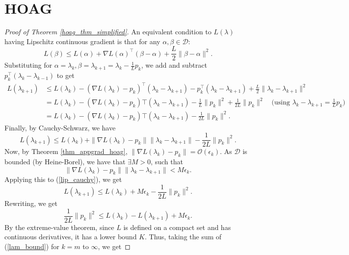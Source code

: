 \documentclass[11pt, twoside]{report}
\begin{document}
\section{HOAG}
\begin{proof}[Proof of Theorem \ref{hoag_thm_simplified}]
An equivalent condition to $L(\lambda)$ having Lipschitz continuous gradient is that for any $\alpha,\beta \in \mathcal{D}:$
\begin{equation} \label{lipschitz_equiv}
    L(\beta) \leq L(\alpha) + \nabla L(\alpha)^\top (\beta - \alpha) + \frac{L}{2}\|\beta - \alpha\|^2.
\end{equation}
Substituting for $\alpha = \lambda_k, \beta = \lambda_{k+1} = \lambda_k - \frac{1}{L}p_k$, we add and subtract $p_k^\top(\lambda_k - \lambda_{k-1})$ to get
\begin{align}
    L(\lambda_{k+1}) &\leq L(\lambda_k) - (\nabla L(\lambda_k) -p_k)^\top(\lambda_k - \lambda_{k+1}) -p_k^\top(\lambda_k - \lambda_{k+1})+\frac{L}{2}\|\lambda_k - \lambda_{k+1}\|^2 \\
    &= L(\lambda_k) - (\nabla L(\lambda_k) -p_k)\top(\lambda_k - \lambda_{k+1}) -\frac{1}{L}\|p_k\|^2+\frac{1}{2L}\|p_k\|^2 \quad \text{(using } \lambda_{k}-\lambda_{k+1} = \frac{1}{L}p_k) \\
    &=L(\lambda_k) - (\nabla L(\lambda_k) -p_k)\top(\lambda_k - \lambda_{k+1}) -\frac{1}{2L}\|p_k\|^2.
\end{align}
Finally, by Cauchy-Schwarz, we have
\begin{equation} \label{lip_cauchy}
    L(\lambda_{k+1}) \leq L(\lambda_k) + \|\nabla L(\lambda_k) -p_k\|\|\lambda_k - \lambda_{k+1}\| -\frac{1}{2L}\|p_k\|^2.
\end{equation}
Now, by Theorem \ref{thm_appgrad_hoag}, $\|\nabla L(\lambda_k) -p_k\| = \mathcal{O}(\epsilon_k)$. As $\mathcal{D}$ is bounded (by Heine-Borel), we have that $\exists M>0$, such that
\[\|\nabla L(\lambda_k) -p_k\|\|\lambda_k - \lambda_{k+1}\| < M\epsilon_k.\]
Applying this to (\ref{lip_cauchy}), we get
\begin{equation} \label{lip_cauchy_2}
    L(\lambda_{k+1}) \leq L(\lambda_k) + M\epsilon_k -\frac{1}{2L}\|p_k\|^2.
\end{equation}
Rewriting, we get
\begin{equation} \label{lam_bound}
    \frac{1}{2L}\|p_k\|^2 \leq L(\lambda_k) - L(\lambda_{k+1}) + M\epsilon_k.
\end{equation}
By the extreme-value theorem, since $L$ is defined on a compact set and has continuous derivatives, it has a lower bound $K$. Thus, taking the sum of (\ref{lam_bound}) for $k = m$ to $\infty$, we get

\end{proof}
\end{document}
